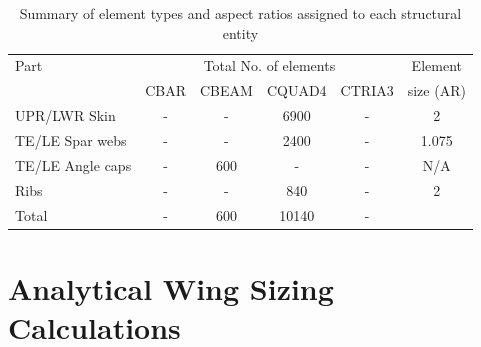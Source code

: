 \documentclass[11pt,a4paper,oneside]{memoir}
\begin{document}
\begin{table}[h]
\centering

\caption{Summary of element types and aspect ratios assigned to each structural entity}
\label{tab:summary-mesh}	
\begin{tabular}{lccccc}
\toprule
Part               & \multicolumn{4}{c}{Total No. of elements}   & Element      \\
\cmidrule{2-5}     &  CBAR & CBEAM  & CQUAD4  & CTRIA3           &   size (AR)  \\
\midrule
UPR/LWR Skin       &   -    &  -      & 6900        &  -                &       2       \\
TE/LE Spar webs    &    -   &   -     &  2400       &     -             &        1.075      \\
TE/LE Angle caps   &  -     &   600     &    -     &    -              &        N/A      \\
Ribs               &   -    &     -   &  840       &        -          &           2   \\
\midrule
Total              &    -   &    600    &     10140    &       -           &              \\
\bottomrule
\end{tabular}
\end{table}

\chapter{Analytical Wing Sizing Calculations}\label{chap:hand-calcs}
\end{document}

